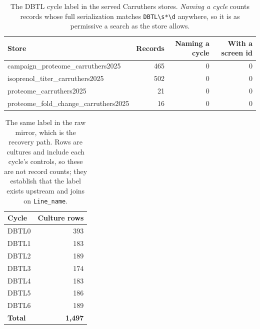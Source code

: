 \begingroup
\footnotesize
\begin{longtable}{@{}L{62mm} r@{\hspace{8pt}} r@{\hspace{8pt}} r@{}}
\caption[]{The DBTL cycle label in the served Carruthers stores. \emph{Naming a cycle} counts records whose full serialization matches \texttt{DBTL\textbackslash s*\textbackslash d} anywhere, so it is as permissive a search as the store allows.}\label{tab:pcscycle}\\
\toprule
\textbf{Store} & \textbf{Records} & \textbf{Naming a cycle} & \textbf{With a screen id} \\
\midrule
\endfirsthead
\bottomrule
\endfoot
campaign\_\allowbreak proteome\_\allowbreak carruthers2025 & 465 & 0 & 0 \\
isoprenol\_\allowbreak titer\_\allowbreak carruthers2025 & 502 & 0 & 0 \\
proteome\_\allowbreak carruthers2025 & 21 & 0 & 0 \\
proteome\_\allowbreak fold\_\allowbreak change\_\allowbreak carruthers2025 & 16 & 0 & 0 \\
\end{longtable}

\begingroup
\footnotesize
\begin{longtable}{@{}L{62mm} r@{}}
\caption[]{The same label in the raw mirror, which is the recovery path. Rows are cultures and include each cycle's controls, so these are not record counts; they establish that the label exists upstream and joins on \texttt{Line\_\allowbreak name}.}\label{tab:pcsrawcycle}\\
\toprule
\textbf{Cycle} & \textbf{Culture rows} \\
\midrule
\endfirsthead
\bottomrule
\endfoot
DBTL0 & 393 \\
DBTL1 & 183 \\
DBTL2 & 189 \\
DBTL3 & 174 \\
DBTL4 & 183 \\
DBTL5 & 186 \\
DBTL6 & 189 \\
\midrule
\textbf{Total} & \textbf{1,497} \\
\end{longtable}
\endgroup
\endgroup
